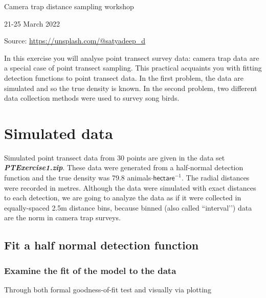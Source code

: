 \documentclass[a4paper, 10pt]{article}
\begin{document}
\phantom{a}

\vspace{5cm}

{\Large Camera trap distance sampling workshop}

{\large 21-25 March 2022}

\begin{flushright}
\tiny{Source: \url{https://unsplash.com/@satyadeep_d}}
\end{flushright}

%
{%
}

In this exercise you will analyse point transect survey data: camera trap data are a special case of point transect sampling. This practical acquaints you with fitting detection functions to point transect data. In the first problem, the data are simulated and so the true density is known. In the second problem, two different data collection methods were used to survey song birds.

\section{Simulated data}
Simulated point transect data from 30 points are given in the data set \textbf{\emph{PTExercise1.zip}}. These data were generated from a half-normal detection function and the true density was 79.8 animals$\cdot \textsf{hectare}^{-1}$.  The radial distances were recorded in metres. Although the data were simulated with exact distances to each detection, we are going to analyze the data as if it were collected in equally-spaced 2.5m distance bins, because binned (also called ``interval’’) data are the norm in camera trap surveys.

\subsection{Fit a half normal detection function}

\subsubsection{Examine the fit of the model to the data}
Through both formal goodness-of-fit test and visually via plotting
\end{document}

